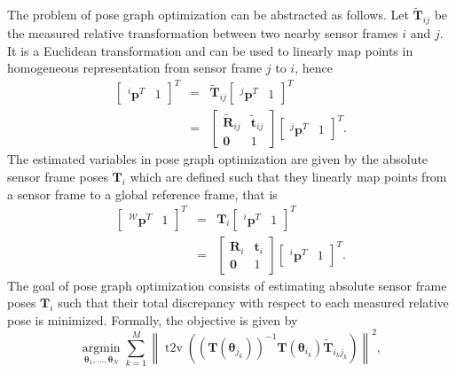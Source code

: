 \documentclass[letterpaper, 10 pt, conference]{ieeeconf}  %
\begin{document}
The problem of pose graph optimization can be abstracted as follows. Let $\tilde{\mathbf{T}}_{ij}$ be the measured relative transformation between two nearby sensor frames $i$ and $j$. It is a Euclidean transformation and can be used to linearly map points in homogeneous representation from sensor frame $j$ to $i$, hence
%
\begin{eqnarray}
  \left[ \begin{matrix} ^i\mathbf{p}^T & 1 \end{matrix}\right]^T & = & \tilde{\mathbf{T}}_{ij} \left[ \begin{matrix} ^j\mathbf{p}^T & 1 \end{matrix}\right]^T \\
  & = & \left[ \begin{matrix} \tilde{\mathbf{R}}_{ij} & \tilde{\mathbf{t}}_{ij} \\ \mathbf{0} & 1 \end{matrix}\right] \left[ \begin{matrix} ^j\mathbf{p}^T & 1 \end{matrix}\right]^T. \nonumber
\end{eqnarray}
%
The estimated variables in pose graph optimization are given by the absolute sensor frame poses $\mathbf{T}_i$ which are defined such that they linearly map points from a sensor frame to a global reference frame, that is
%
\begin{eqnarray}
  \left[ \begin{matrix} ^\mathcal{W}\mathbf{p}^T & 1 \end{matrix}\right]^T & = & \mathbf{T}_{i}  \left[ \begin{matrix} ^i\mathbf{p}^T & 1 \end{matrix}\right]^T \\
  & = & \left[ \begin{matrix} \mathbf{R}_{i} & \mathbf{t}_{i} \\ \mathbf{0} & 1 \end{matrix}\right] \left[ \begin{matrix} ^i\mathbf{p}^T & 1 \end{matrix}\right]^T. \nonumber
\end{eqnarray}
%
The goal of pose graph optimization consists of estimating absolute sensor frame poses $\mathbf{T}_i$ such that their total discrepancy with respect to each measured relative pose is minimized. Formally, the objective is given by
%
\begin{equation}
  \underset{\boldsymbol{\theta}_1, \ldots, \boldsymbol{\theta}_N}{\operatorname{argmin}} \sum_{k=1}^{M} \left\| \operatorname{t2v}
  \left(\left(\mathbf{T}\left(\boldsymbol{\theta}_{j_k}\right)\right)^{-1}\mathbf{T}\left(\boldsymbol{\theta}_{i_k}\right)\tilde{\mathbf{T}}_{i_kj_k} \right)\right\|^2,
\end{equation}
\end{document}
